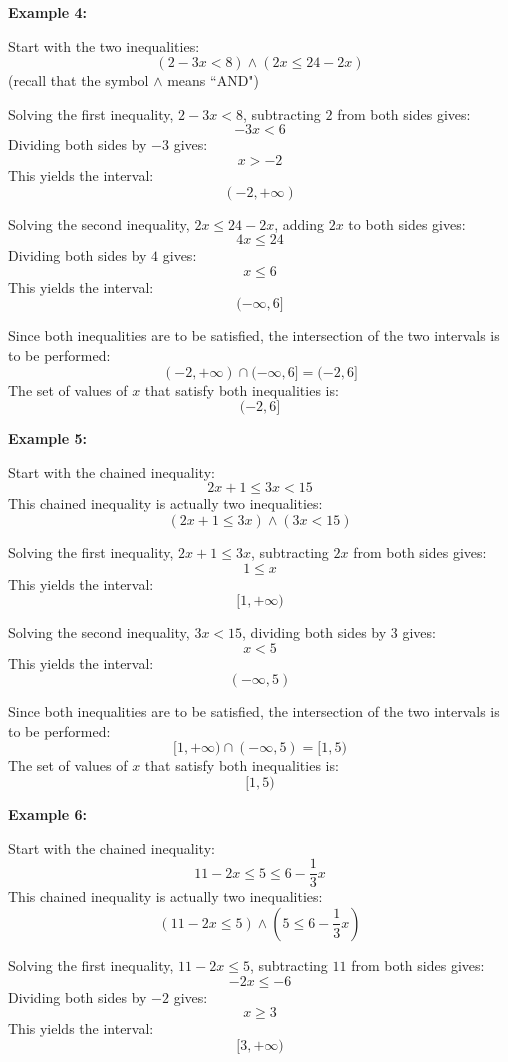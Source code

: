 \documentclass{article}
\begin{document}
\textbf{Example 4:}

Start with the two inequalities: 
\[(2 - 3x < 8) \wedge (2x \leq 24 - 2x)\]
(recall that the symbol \(\wedge\) means ``AND")

Solving the first inequality, \(2 - 3x < 8\), subtracting \(2\) from both sides gives:
\[-3x < 6\]
Dividing both sides by \(-3\) gives:
\[x > -2\]
This yields the interval:
\[(-2, +\infty)\] 

Solving the second inequality, \(2x \leq 24 - 2x\), adding \(2x\) to both sides gives:
\[4x \leq 24\]
Dividing both sides by \(4\) gives:
\[x \leq 6\]
This yields the interval:
\[(-\infty, 6]\] 

Since both inequalities are to be satisfied, the intersection of the two intervals is to be performed:
\[(-2, +\infty) \cap (-\infty, 6] = (-2, 6]\]
The set of values of \(x\) that satisfy both inequalities is:
\[(-2, 6]\]

\vspace{5mm}



\textbf{Example 5:}

Start with the chained inequality:
\[2x + 1 \leq 3x < 15\]
This chained inequality is actually two inequalities:
\[(2x + 1 \leq 3x) \wedge (3x < 15)\]

Solving the first inequality, \(2x + 1 \leq 3x\), subtracting \(2x\) from both sides gives:
\[1 \leq x\]
This yields the interval:
\[[1, +\infty)\]

Solving the second inequality, \(3x < 15\), dividing both sides by \(3\) gives:
\[x < 5\]
This yields the interval:
\[(-\infty, 5)\]

Since both inequalities are to be satisfied, the intersection of the two intervals is to be performed:
\[[1, +\infty) \cap (-\infty, 5) = [1, 5)\]
The set of values of \(x\) that satisfy both inequalities is:
\[[1, 5)\]

\vspace{5mm}



\textbf{Example 6:}

Start with the chained inequality:
\[11 - 2x \leq 5 \leq 6 - \frac{1}{3}x\]
This chained inequality is actually two inequalities:
\[(11 - 2x \leq 5) \wedge (5 \leq 6 - \frac{1}{3}x)\]

Solving the first inequality, \(11 - 2x \leq 5\), subtracting \(11\) from both sides gives:
\[-2x \leq -6\]
Dividing both sides by \(-2\) gives:
\[x \geq 3\]
This yields the interval:
\[[3, +\infty)\]
\end{document}
